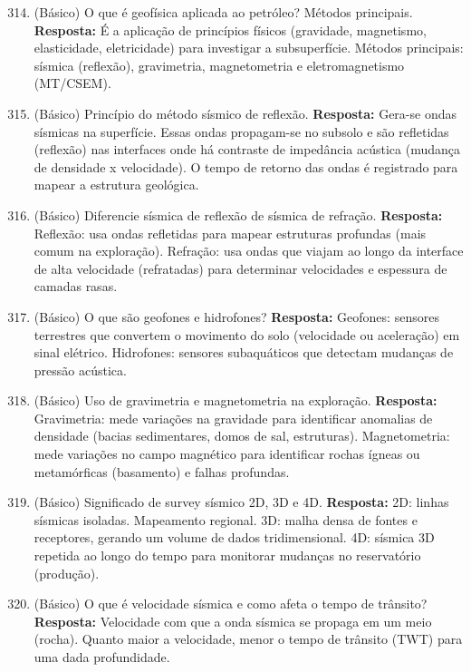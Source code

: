 \documentclass[11pt,a4paper]{article}
\begin{document}
\begin{enumerate}
  \setcounter{enumi}{313}
  \item (Básico) O que é geofísica aplicada ao petróleo? Métodos principais.
  \textbf{Resposta:} É a aplicação de princípios físicos (gravidade, magnetismo, elasticidade, eletricidade) para investigar a subsuperfície. Métodos principais: sísmica (reflexão), gravimetria, magnetometria e eletromagnetismo (MT/CSEM).

  \item (Básico) Princípio do método sísmico de reflexão.
  \textbf{Resposta:} Gera-se ondas sísmicas na superfície. Essas ondas propagam-se no subsolo e são refletidas (reflexão) nas interfaces onde há contraste de impedância acústica (mudança de densidade x velocidade). O tempo de retorno das ondas é registrado para mapear a estrutura geológica.

  \item (Básico) Diferencie sísmica de reflexão de sísmica de refração.
  \textbf{Resposta:} Reflexão: usa ondas refletidas para mapear estruturas profundas (mais comum na exploração). Refração: usa ondas que viajam ao longo da interface de alta velocidade (refratadas) para determinar velocidades e espessura de camadas rasas.

  \item (Básico) O que são geofones e hidrofones?
  \textbf{Resposta:} Geofones: sensores terrestres que convertem o movimento do solo (velocidade ou aceleração) em sinal elétrico. Hidrofones: sensores subaquáticos que detectam mudanças de pressão acústica.

  \item (Básico) Uso de gravimetria e magnetometria na exploração.
  \textbf{Resposta:} Gravimetria: mede variações na gravidade para identificar anomalias de densidade (bacias sedimentares, domos de sal, estruturas). Magnetometria: mede variações no campo magnético para identificar rochas ígneas ou metamórficas (basamento) e falhas profundas.

  \item (Básico) Significado de survey sísmico 2D, 3D e 4D.
  \textbf{Resposta:} 2D: linhas sísmicas isoladas. Mapeamento regional. 3D: malha densa de fontes e receptores, gerando um volume de dados tridimensional. 4D: sísmica 3D repetida ao longo do tempo para monitorar mudanças no reservatório (produção).

  \item (Básico) O que é velocidade sísmica e como afeta o tempo de trânsito?
  \textbf{Resposta:} Velocidade com que a onda sísmica se propaga em um meio (rocha). Quanto maior a velocidade, menor o tempo de trânsito (TWT) para uma dada profundidade.


\end{enumerate}
\end{document}
